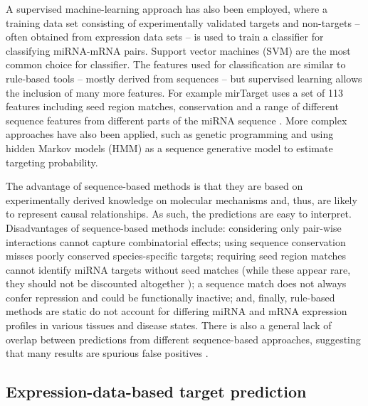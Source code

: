
A supervised machine-learning approach has also been employed, where a
training data set consisting of experimentally validated targets and non-targets
-- often obtained from expression data sets -- is used to train a
classifier for classifying miRNA-mRNA pairs. Support vector machines (SVM)
are the most common choice for classifier. The features used for classification
are similar to rule-based tools -- mostly derived from sequences -- but supervised
learning allows the inclusion of many more features. For example mirTarget
uses a set of 113 features including seed region matches, conservation and a
range of different sequence features from different parts of the miRNA
sequence \citep{mirTarget}. More complex approaches have also been applied,
such as genetic programming and using hidden Markov models (HMM) as a sequence
generative model to estimate targeting probability.


The advantage of sequence-based methods is that they are based on
experimentally derived knowledge on molecular mechanisms and, thus, are likely
to represent causal relationships. As such, the predictions are easy to
interpret. Disadvantages of sequence-based methods include: considering only
pair-wise interactions cannot capture combinatorial effects; using sequence
conservation misses poorly conserved species-specific targets; requiring seed
region matches cannot identify miRNA targets without seed matches (while these
appear rare, they should not be discounted altogether \citep{Bartel2009}); a
sequence match does not always confer %
repression and could be functionally inactive; and, finally, rule-based
methods are static do not account for differing miRNA and mRNA expression
profiles in various tissues and disease states. There is also a general lack
of overlap between predictions from different sequence-based approaches,
suggesting that many results are spurious false positives
\citep{Muniategui2013}.




\subsection{Expression-data-based target prediction}\label{expr-methods}


